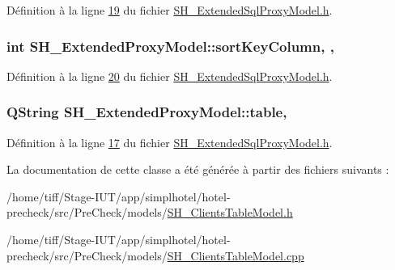 Définition à la ligne \hyperlink{SH__ExtendedSqlProxyModel_8h_source_l00019}{19} du fichier \hyperlink{SH__ExtendedSqlProxyModel_8h_source}{S\-H\-\_\-\-Extended\-Sql\-Proxy\-Model.\-h}.

\hypertarget{classSH__ExtendedProxyModel_a47e2d0b99b84fb066438db667dd1ad26}{
\subsubsection[{sort\-Key\-Column}]{\setlength{\rightskip}{0pt plus 5cm}int S\-H\-\_\-\-Extended\-Proxy\-Model\-::sort\-Key\-Column\hspace{0.3cm}{\ttfamily [read]}, {\ttfamily [write]}, {\ttfamily [inherited]}}}\label{classSH__ExtendedProxyModel_a47e2d0b99b84fb066438db667dd1ad26}


Définition à la ligne \hyperlink{SH__ExtendedSqlProxyModel_8h_source_l00020}{20} du fichier \hyperlink{SH__ExtendedSqlProxyModel_8h_source}{S\-H\-\_\-\-Extended\-Sql\-Proxy\-Model.\-h}.

\hypertarget{classSH__ExtendedProxyModel_a7eef4557a77444e9ce5c24c180392bfa}{
\subsubsection[{table}]{\setlength{\rightskip}{0pt plus 5cm}Q\-String S\-H\-\_\-\-Extended\-Proxy\-Model\-::table\hspace{0.3cm}{\ttfamily [read]}, {\ttfamily [inherited]}}}\label{classSH__ExtendedProxyModel_a7eef4557a77444e9ce5c24c180392bfa}


Définition à la ligne \hyperlink{SH__ExtendedSqlProxyModel_8h_source_l00017}{17} du fichier \hyperlink{SH__ExtendedSqlProxyModel_8h_source}{S\-H\-\_\-\-Extended\-Sql\-Proxy\-Model.\-h}.



La documentation de cette classe a été générée à partir des fichiers suivants \-:\begin{DoxyCompactItemize}
\item 
/home/tiff/\-Stage-\/\-I\-U\-T/app/simplhotel/hotel-\/precheck/src/\-Pre\-Check/models/\hyperlink{SH__ClientsTableModel_8h}{S\-H\-\_\-\-Clients\-Table\-Model.\-h}\item 
/home/tiff/\-Stage-\/\-I\-U\-T/app/simplhotel/hotel-\/precheck/src/\-Pre\-Check/models/\hyperlink{SH__ClientsTableModel_8cpp}{S\-H\-\_\-\-Clients\-Table\-Model.\-cpp}\end{DoxyCompactItemize}
